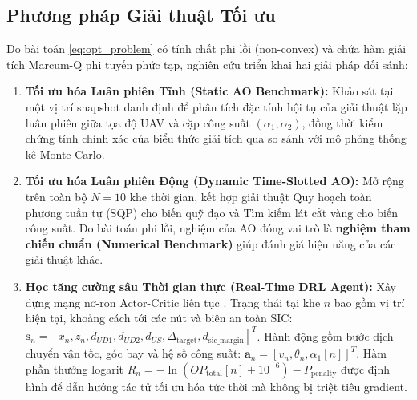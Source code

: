 \subsection*{Phương pháp Giải thuật Tối ưu}
Do bài toán \eqref{eq:opt_problem} có tính chất phi lồi (non-convex) và chứa hàm giải tích Marcum-Q phi tuyến phức tạp, nghiên cứu triển khai hai giải pháp đối sánh:
\begin{enumerate}[label=\textbf{\arabic*.}]
    \item \textbf{Tối ưu hóa Luân phiên Tĩnh (Static AO Benchmark):} Khảo sát tại một vị trí snapshot danh định để phân tích đặc tính hội tụ của giải thuật lặp luân phiên giữa tọa độ UAV và cặp công suất $(\alpha_1, \alpha_2)$, đồng thời kiểm chứng tính chính xác của biểu thức giải tích qua so sánh với mô phỏng thống kê Monte-Carlo.
    \item \textbf{Tối ưu hóa Luân phiên Động (Dynamic Time-Slotted AO):} Mở rộng trên toàn bộ $N=10$ khe thời gian, kết hợp giải thuật Quy hoạch toàn phương tuần tự (SQP) cho biến quỹ đạo và Tìm kiếm lát cắt vàng cho biến công suất. Do bài toán phi lồi, nghiệm của AO đóng vai trò là \textbf{nghiệm tham chiếu chuẩn (Numerical Benchmark)} giúp đánh giá hiệu năng của các giải thuật khác.
    \item \textbf{Học tăng cường sâu Thời gian thực (Real-Time DRL Agent):} Xây dựng mạng nơ-ron Actor-Critic liên tục \cite{lillicrap2015continuous}. Trạng thái tại khe $n$ bao gồm vị trí hiện tại, khoảng cách tới các nút và biên an toàn SIC: $\mathbf{s}_n = [x_n, z_n, d_{UD1}, d_{UD2}, d_{US}, \Delta_{\text{target}}, d_{\text{sic\_margin}}]^T$. Hành động gồm bước dịch chuyển vận tốc, góc bay và hệ số công suất: $\mathbf{a}_n = [v_n, \theta_n, \alpha_1[n]]^T$. Hàm phần thưởng logarit $R_n = -\ln(OP_{\text{total}}[n] + 10^{-6}) - P_{\text{penalty}}$ được định hình để dẫn hướng tác tử tối ưu hóa tức thời mà không bị triệt tiêu gradient.
\end{enumerate}
